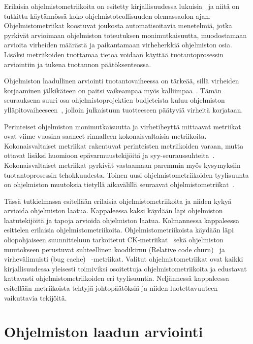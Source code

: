 \documentclass[finnish]{tktltiki2}
\theoremstyle{definition}
\theoremstyle{remark}
\begin{document}
Erilaisia ohjelmistometriikoita on esitetty kirjallisuudessa lukuisia~\cite{M76, H77, CK94, GKMS00, ZN08} ja niitä on tutkittu käytännössä koko ohjelmistoteollisuuden olemassaolon ajan. Ohjelmistometriikat koostuvat joukosta automatisoitavia menetelmiä, jotka pyrkivät arvioimaan ohjelmiston toteutuksen monimutkaisuutta, muodostamaan arvioita virheiden määrästä ja paikantamaan virheherkkiä ohjelmiston osia. Lisäksi metriikoiden tuottamaa tietoa voidaan käyttää tuotantoprosessin arviointiin ja tukena tuotannon päätöksenteossa.

Ohjelmiston laadullinen arviointi tuotantovaiheessa on tärkeää, sillä virheiden korjaaminen jälkikäteen on paitsi vaikeampaa myös kalliimpaa~\cite{T02}. Tämän seurauksena suuri osa ohjelmistoprojektien budjeteista kuluu ohjelmiston ylläpitovaiheeseen~\cite{CALO94, G83}, jolloin julkaistuun tuotteeseen päätyviä virheitä korjataan.

Perinteiset ohjelmiston monimutkaisuutta ja virhetiheyttä mittaavat metriikat ovat viime vuosina saaneet rinnalleen kokonaisvaltaisia metriikoita. Kokonaisvaltaiset metriikat rakentuvat perinteisten metriikoiden varaan, mutta ottavat lisäksi huomioon epävarmuustekijöitä ja syy-seuraussuhteita~\cite{FNMHMKM07}. Kokonaisvaltaiset metriikat pyrkivät vastaamaan paremmin myös kysymyksiin tuotantoprosessin tehokkuudesta. Toinen uusi ohjelmistometriikoiden tyylisuunta on ohjelmiston muutoksia tietyllä aikavälillä seuraavat ohjelmistometriikat~\cite{NB05, ME98, KZWZ07}.

Tässä tutkielmassa esitellään erilaisia ohjelmistometriikoita ja niiden kykyä arvioida ohjelmiston laatua. Kappaleessa kaksi käydään läpi ohjelmiston laatutekijöitä ja tapoja arvioida ohjelmiston laatua. Kolmannessa kappaleessa esittelen erilaisia ohjelmistometriikoita. Ohjelmistometriikoista käydään läpi oliopohjaiseen suunnitteluun tarkoitetut CK-metriikat~\cite{CK91, CK94} sekä ohjelmiston muutokseen perustuvat suhteellinen koodikirnu (Relative code churn)~\cite{NB05} ja virhevälimuisti (bug cache)~\cite{KZWZ07} -metriikat. Valitut ohjelmistometriikat ovat kaikki kirjallisuudessa yleisesti toimiviksi osoitettuja ohjelmistometriikoita ja edustavat kattavasti ohjelmistometriikoiden eri tyylisuuntia. Neljännessä kappaleessa esitellään metriikoista tehtyjä johtopäätöksiä ja niiden luotettavuuteen vaikuttavia tekijöitä.

\section{Ohjelmiston laadun arviointi}
\end{document}

